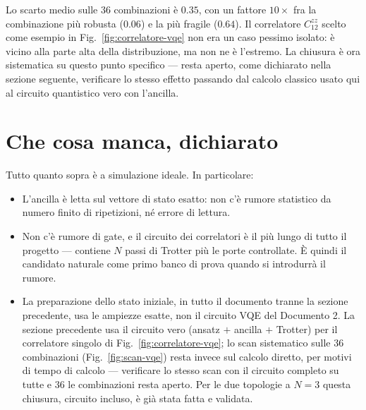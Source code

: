 \documentclass[11pt,a4paper]{article}
\begin{document}
\FloatBarrier

Lo scarto medio sulle $36$ combinazioni è $0.35$, con un fattore
$10\times$ fra la combinazione più robusta ($0.06$) e la più fragile ($0.64$).
Il correlatore $C_{12}^{zz}$ scelto come esempio in Fig.~\ref{fig:correlatore-vqe}
non era un caso pessimo isolato: è vicino alla parte alta della distribuzione,
ma non ne è l'estremo. La chiusura è ora sistematica su questo punto
specifico --- resta aperto, come dichiarato nella sezione seguente, verificare
lo stesso effetto passando dal calcolo classico usato qui al circuito
quantistico vero con l'ancilla.


\section{Che cosa manca, dichiarato}

Tutto quanto sopra è a simulazione ideale. In particolare:

\begin{itemize}[leftmargin=1.5em,itemsep=2pt]
\item L'ancilla è letta sul vettore di stato esatto: non c'è rumore statistico
da numero finito di ripetizioni, né errore di lettura.
\item Non c'è rumore di gate, e il circuito dei correlatori è il più lungo di
tutto il progetto --- contiene $N$ passi di Trotter più le porte controllate.
È quindi il candidato naturale come primo banco di prova quando si introdurrà
il rumore.
\item La preparazione dello stato iniziale, in tutto il documento tranne la
sezione precedente, usa le ampiezze esatte, non il circuito VQE del
Documento 2. La sezione precedente usa il circuito vero (ansatz $+$ ancilla
$+$ Trotter) per il correlatore singolo di
Fig.~\ref{fig:correlatore-vqe}; lo scan sistematico sulle $36$ combinazioni
(Fig.~\ref{fig:scan-vqe}) resta invece sul calcolo diretto, per motivi di
tempo di calcolo --- verificare lo stesso scan con il circuito completo su
tutte e $36$ le combinazioni resta aperto. Per le due topologie a $N=3$
questa chiusura, circuito incluso, è già stata fatta e validata.
\end{itemize}
\end{document}
